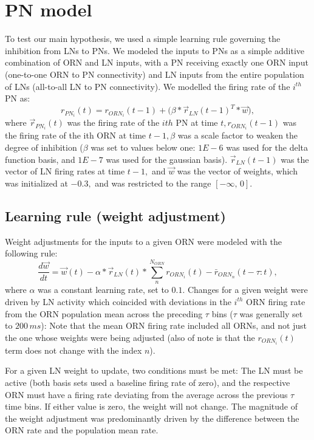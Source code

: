 \documentclass[a4paper,12pt,twoside]{article}
\begin{document}
\section{PN model}
To test our main hypothesis, we used a simple learning rule governing the inhibition from LNs to PNs.  We modeled the inputs to PNs as a simple additive combination of ORN and LN inputs, with a PN receiving exactly one ORN input (one-to-one ORN to PN connectivity) and LN inputs from the entire population of LNs (all-to-all LN to PN connectivity).  We modelled the firing rate of the $i^{th}$ PN as:
\begin{equation}
r_{PN_i}(t) = r_{ORN_i}(t - 1) +  \Big(\beta * \vec{r}_{LN}(t - 1)^T * \vec{w}\Big),
\label{eq:PN}
\end{equation}
where $\vec{r}_{PN_i}(t)$ was the firing rate of the $ ith$ PN at time $ t, r_{ORN_i}(t - 1)$ was the firing rate of the ith ORN at time $t - 1, \beta$ was a scale factor to weaken the degree of inhibition ($\beta$ was set to values below one: $1E-6$ was used for the delta function basis, and $1E-7$ was used for the gaussian basis).  $\vec{r}_{LN}(t - 1)$ was the vector of LN firing rates at time $t - 1,$ and $\vec{w}$ was the vector of weights, which was initialized at $-0.3,$ and was restricted to the range $[-\infty, \, 0]$.

\subsection{Learning rule (weight adjustment)}
Weight adjustments for the inputs to a given ORN were modeled with the following rule:
\begin{equation}
\frac{d\vec{w}}{dt} = \vec{w}(t) - \alpha * \vec{r}_{LN}(t) * \sum\limits_{n}^{N_{ORN}} r_{ORN_i}(t) - \bar{r}_{ORN_n}(t - \tau : t),
\end{equation}
where $\alpha$ was a constant learning rate, set to $0.1$.  Changes for a given weight were driven by LN activity which coincided with deviations in the $i^{th}$ ORN firing rate from the ORN population mean across the preceding $\tau$ bins ($\tau$ was generally set to $200 \,ms$): Note that the mean ORN firing rate included all ORNs, and not just the one whose weights were being adjusted (also of note is that the $r_{ORN_i}(t)$ term does not change with the index $n$).    

For a given LN weight to update, two conditions must be met: The LN must be active (both basis sets used a baseline firing rate of zero), and the respective ORN must have a firing rate deviating from the average across the previous $\tau$ time bins.  If either value is zero, the weight will not change.  The magnitude of the weight adjustment was predominantly driven by the difference between the ORN rate and the population mean rate.
\end{document}

